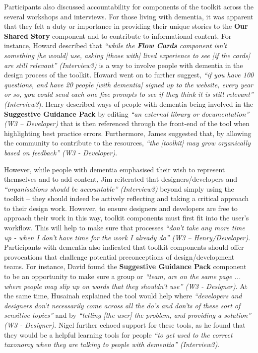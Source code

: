 Participants also discussed accountability for components of the toolkit across the several workshops and interviews. For those living with dementia, it was apparent that they felt a duty or importance in providing their unique stories to the \textbf{Our Shared Story} component and to contribute to informational content. For instance, Howard described that \textit{``while the \textbf{Flow Cards} component isn't something [he would] use, asking [those with] lived experience to see [if the cards] are still relevant'' (Interview3)} is a way to involve people with dementia in the design process of the toolkit. Howard went on to further suggest, \textit{``if you have 100 questions, and have 20 people [with dementia] signed up to the website, every year or so, you could send each one five prompts to see if they think it is still relevant'' (Interview3}). Henry described ways of people with dementia being involved in the \textbf{Suggestive Guidance Pack} by editing \textit{``an external library or documentation'' (W3 – Developer)} that is then referenced through the front-end of the tool when highlighting best practice errors. Furthermore, James suggested that, by allowing the community to contribute to the resources, \textit{``the [toolkit] may grow organically based on feedback'' (W3 - Developer)}. 

However, while people with dementia emphasised their wish to represent themselves and to add content, Jim reiterated that designers/developers and \textit{``organisations should be accountable'' (Interview3)} beyond simply using the toolkit – they should indeed be actively reflecting and taking a critical approach to their design work. However, to ensure designers and developers are free to approach their work in this way, toolkit components must first fit into the user's workflow. This will help to make sure that processes \textit{``don't take any more time up - when I don't have time for the work I already do'' (W3 – Henry/Developer)}. Participants with dementia also indicated that toolkit components should offer provocations that challenge potential preconceptions of design/development teams. For instance, David found the \textbf{Suggestive Guidance Pack }component to be an opportunity to make sure a group or \textit{``team, are on the same page ... where people may slip up on words that they shouldn't use'' (W3 - Designer)}. At the same time, Husainah explained the tool would help where \textit{``developers and designers don't necessarily come across all the do's and don'ts of these sort of sensitive topics''} and by \textit{``telling [the user] the problem, and providing a solution'' (W3 - Designer)}. Nigel further echoed support for these tools, as he found that they would be a helpful learning tools for people \textit{``to get used to the correct taxonomy when they are talking to people with dementia'' (Interview3)}. 

